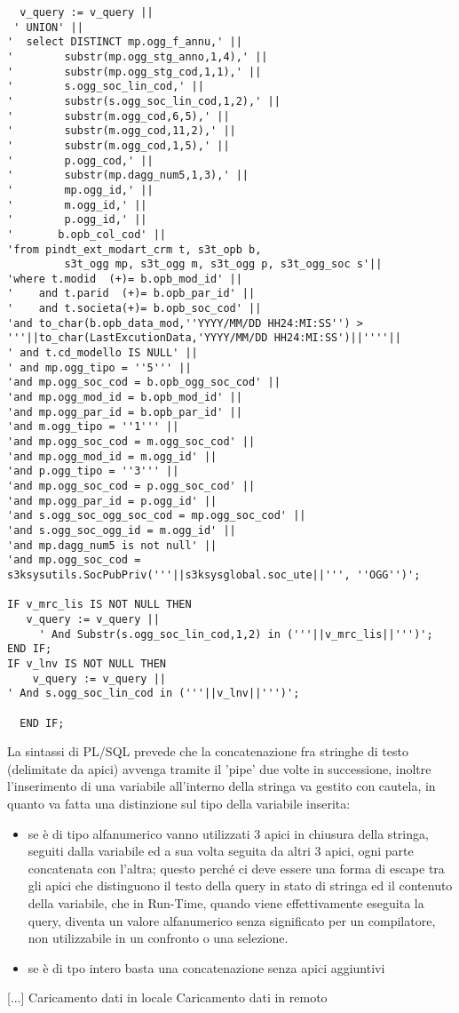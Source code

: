 \begin{lstlisting}
  v_query := v_query ||
 ' UNION' ||
'  select DISTINCT mp.ogg_f_annu,' ||
'        substr(mp.ogg_stg_anno,1,4),' ||
'        substr(mp.ogg_stg_cod,1,1),' ||
'        s.ogg_soc_lin_cod,' ||
'        substr(s.ogg_soc_lin_cod,1,2),' ||
'        substr(m.ogg_cod,6,5),' ||
'        substr(m.ogg_cod,11,2),' ||
'        substr(m.ogg_cod,1,5),' ||
'        p.ogg_cod,' ||
'        substr(mp.dagg_num5,1,3),' ||
'        mp.ogg_id,' ||
'        m.ogg_id,' ||
'        p.ogg_id,' ||
'       b.opb_col_cod' ||
'from pindt_ext_modart_crm t, s3t_opb b, 
         s3t_ogg mp, s3t_ogg m, s3t_ogg p, s3t_ogg_soc s'|| 
'where t.modid  (+)= b.opb_mod_id' ||
'    and t.parid  (+)= b.opb_par_id' ||
'    and t.societa(+)= b.opb_soc_cod' ||
'and to_char(b.opb_data_mod,''YYYY/MM/DD HH24:MI:SS'') > 
'''||to_char(LastExcutionData,'YYYY/MM/DD HH24:MI:SS')||''''|| 
' and t.cd_modello IS NULL' ||
' and mp.ogg_tipo = ''5''' ||
'and mp.ogg_soc_cod = b.opb_ogg_soc_cod' ||
'and mp.ogg_mod_id = b.opb_mod_id' ||
'and mp.ogg_par_id = b.opb_par_id' ||
'and m.ogg_tipo = ''1''' ||
'and mp.ogg_soc_cod = m.ogg_soc_cod' ||
'and mp.ogg_mod_id = m.ogg_id' ||
'and p.ogg_tipo = ''3''' ||
'and mp.ogg_soc_cod = p.ogg_soc_cod' ||
'and mp.ogg_par_id = p.ogg_id' ||
'and s.ogg_soc_ogg_soc_cod = mp.ogg_soc_cod' ||
'and s.ogg_soc_ogg_id = m.ogg_id' ||
'and mp.dagg_num5 is not null' ||
'and mp.ogg_soc_cod = 
s3ksysutils.SocPubPriv('''||s3ksysglobal.soc_ute||''', ''OGG'')';

IF v_mrc_lis IS NOT NULL THEN
   v_query := v_query || 
     ' And Substr(s.ogg_soc_lin_cod,1,2) in ('''||v_mrc_lis||''')';
END IF;
IF v_lnv IS NOT NULL THEN
    v_query := v_query || 
' And s.ogg_soc_lin_cod in ('''||v_lnv||''')';
    
  END IF;
\end{lstlisting}
La sintassi di PL/SQL prevede che la concatenazione fra stringhe di testo (delimitate da apici) avvenga tramite il 'pipe' due volte in successione, inoltre l'inserimento di una variabile all'interno della stringa va gestito con cautela, in quanto va fatta una distinzione sul tipo della variabile inserita: \\
\begin{itemize}
\item se è di tipo alfanumerico vanno utilizzati 3 apici in chiusura della stringa, seguiti dalla variabile ed a sua volta seguita da altri 3 apici, ogni parte concatenata con l'altra; questo perché ci deve essere una forma di escape tra gli apici che distinguono il testo della query in stato di stringa ed il contenuto della variabile, che in Run-Time, quando viene effettivamente eseguita la query, diventa un valore alfanumerico senza significato per un compilatore, non utilizzabile in un confronto o una selezione.\\
\item se è di tpo intero basta una concatenazione senza apici aggiuntivi
\end{itemize}
[...]
Caricamento dati in locale \newline
[...]
Caricamento dati in remoto \newline
[...]
